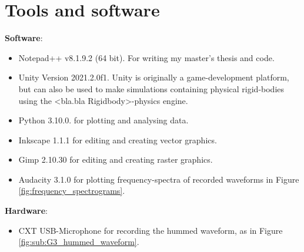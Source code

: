 \chapter{Tools and software}
\label{chap:tools_and_software}
	
	\textbf{Software}:
	\begin{itemize}
		\item Notepad++ v8.1.9.2 (64 bit). For writing my master's thesis and code.
		
		\item Unity Version 2021.2.0f1. Unity is originally a game-development platform, but can also be used to make  simulations containing physical rigid-bodies using the <bla.bla Rigidbody>-physics engine.
		
		\item Python 3.10.0. for plotting and analysing data.
		
		\item Inkscape 1.1.1 for editing and creating vector graphics.
		
		\item Gimp 2.10.30 for editing and creating raster graphics.
		
		\item Audacity 3.1.0 for plotting frequency-spectra of recorded waveforms in Figure \ref{fig:frequency_spectrograms}.
	\end{itemize}
	
	\textbf{Hardware}:
	\begin{itemize}
		\item CXT USB-Microphone for recording the hummed waveform, as in Figure \ref{fig:sub:G3_hummed_waveform}.
	\end{itemize}
	
